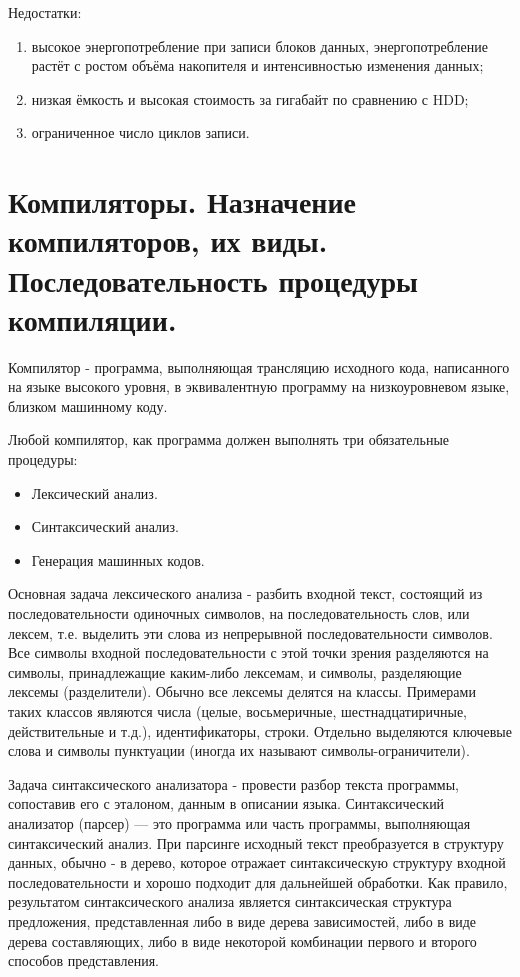 \documentclass[unicode, 12pt, a4paper, oneside]{article}
\begin{document}
Недостатки: 

\begin{enumerate}
\item высокое энергопотребление при записи блоков данных, энергопотребление растёт с ростом объёма накопителя и интенсивностью изменения данных; 
\item низкая ёмкость и высокая стоимость за гигабайт по сравнению с HDD;
\item ограниченное число циклов записи.
\end{enumerate}

\section{Компиляторы. Назначение компиляторов, их виды. Последовательность процедуры компиляции.}

Компилятор - программа, выполняющая трансляцию исходного кода, написанного на языке высокого уровня, в эквивалентную программу на низкоуровневом языке, близком машинному коду.

Любой компилятор, как программа должен выполнять три обязательные процедуры:
\begin{itemize}
\item Лексический анализ.
\item Синтаксический анализ.
\item Генерация машинных кодов.
\end{itemize}

Основная задача лексического анализа - разбить входной текст, состоящий из последовательности одиночных символов, на последовательность слов, или лексем, т.е. выделить эти слова из непрерывной последовательности символов. Все символы входной последовательности с этой точки зрения разделяются на символы, принадлежащие каким-либо лексемам, и символы, разделяющие лексемы (разделители). Обычно все лексемы делятся на классы. Примерами таких классов являются числа (целые, восьмеричные, шестнадцатиричные, действительные и т.д.), идентификаторы, строки. Отдельно выделяются ключевые слова и символы пунктуации (иногда их называют символы-ограничители).

Задача синтаксического анализатора - провести разбор текста программы, сопоставив его с эталоном, данным в описании языка. Синтаксический анализатор (парсер) — это программа или часть программы, выполняющая синтаксический анализ. При парсинге исходный текст преобразуется в структуру данных, обычно - в дерево, которое отражает синтаксическую структуру входной последовательности и хорошо подходит для дальнейшей обработки. Как правило, результатом синтаксического анализа является синтаксическая структура предложения, представленная либо в виде дерева зависимостей, либо в виде дерева составляющих, либо в виде некоторой комбинации первого и второго способов представления.
\end{document}
